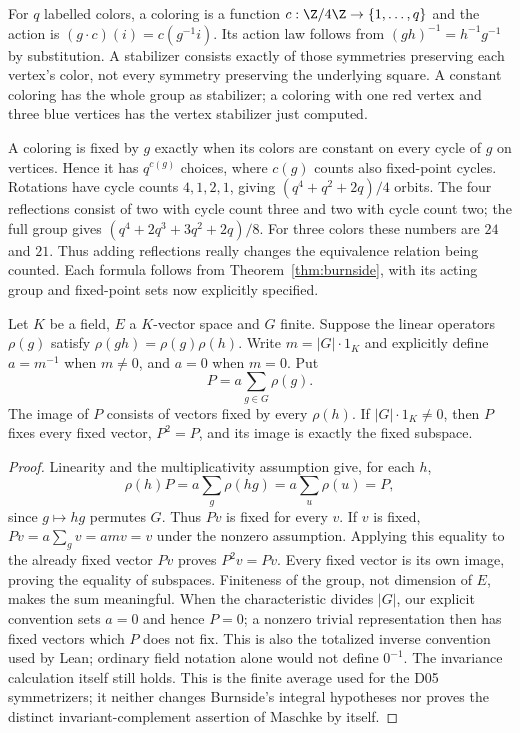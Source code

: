For $q$ labelled colors, a coloring is a function $c:\Z/4\Z\to\{1,\ldots,q\}$ and the action is $(g\cdot c)(i)=c(g^{-1}i)$. Its action law follows from $(gh)^{-1}=h^{-1}g^{-1}$ by substitution. A stabilizer consists exactly of those symmetries preserving each vertex's color, not every symmetry preserving the underlying square. A constant coloring has the whole group as stabilizer; a coloring with one red vertex and three blue vertices has the vertex stabilizer just computed.

A coloring is fixed by $g$ exactly when its colors are constant on every cycle of $g$ on vertices. Hence it has $q^{c(g)}$ choices, where $c(g)$ counts also fixed-point cycles. Rotations have cycle counts $4,1,2,1$, giving $(q^4+q^2+2q)/4$ orbits. The four reflections consist of two with cycle count three and two with cycle count two; the full group gives $(q^4+2q^3+3q^2+2q)/8$. For three colors these numbers are $24$ and $21$. Thus adding reflections really changes the equivalence relation being counted. Each formula follows from Theorem~\ref{thm:burnside}, with its acting group and fixed-point sets now explicitly specified.

\begin{theorem}\label{thm:group-average}
Let $K$ be a field, $E$ a $K$-vector space and $G$ finite. Suppose the linear operators $\rho(g)$ satisfy $\rho(gh)=\rho(g)\rho(h)$. Write $m=|G|\cdot1_K$ and explicitly define $a=m^{-1}$ when $m\ne0$, and $a=0$ when $m=0$. Put
\[
 P=a\sum_{g\in G}\rho(g).
\]
The image of $P$ consists of vectors fixed by every $\rho(h)$. If $|G|\cdot1_K\ne0$, then $P$ fixes every fixed vector, $P^2=P$, and its image is exactly the fixed subspace.
\end{theorem}
\begin{proof}
Linearity and the multiplicativity assumption give, for each $h$,
\[
 \rho(h)P=a\sum_g\rho(hg)=a\sum_u\rho(u)=P,
\]
since $g\mapsto hg$ permutes $G$. Thus $Pv$ is fixed for every $v$. If $v$ is fixed, $Pv=a\sum_gv=amv=v$ under the nonzero assumption. Applying this equality to the already fixed vector $Pv$ proves $P^2v=Pv$. Every fixed vector is its own image, proving the equality of subspaces. Finiteness of the group, not dimension of $E$, makes the sum meaningful. When the characteristic divides $|G|$, our explicit convention sets $a=0$ and hence $P=0$; a nonzero trivial representation then has fixed vectors which $P$ does not fix. This is also the totalized inverse convention used by Lean; ordinary field notation alone would not define $0^{-1}$. The invariance calculation itself still holds. This is the finite average used for the D05 symmetrizers; it neither changes Burnside's integral hypotheses nor proves the distinct invariant-complement assertion of Maschke by itself.
\end{proof}
